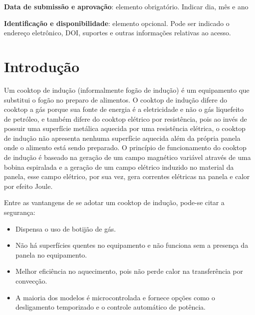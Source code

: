 \documentclass[
	article,			%
	11pt,				%
	oneside,			%
	a4paper,			%
	english,			%
	brazil,				%
	sumario=tradicional
	]{abntex2}
\begin{document}

\begin{center}\smaller
\textbf{Data de submissão e aprovação}: elemento obrigatório. Indicar dia, mês e ano

\textbf{Identificação e disponibilidade}: elemento opcional. Pode ser indicado 
o endereço eletrônico, DOI, suportes e outras informações relativas ao acesso.
\end{center}

\textual

\section{Introdução}

Um cooktop de indução (informalmente fogão de indução) é um equipamento que substitui o fogão no preparo de alimentos. O cooktop de indução difere do cooktop a gás porque sua fonte de energia é a eletricidade e não o gás liquefeito de petróleo, e também difere do cooktop elétrico por resistência, pois ao invés de possuir uma superfície metálica aquecida por uma resistência elétrica, o cooktop de indução não apresenta nenhuma superfície aquecida além da própria panela onde o alimento está sendo preparado. O princípio de funcionamento do cooktop de indução é baseado na geração de um campo magnético variável através de uma bobina espiralada e a geração de um campo elétrico induzido no material da panela, esse campo elétrico, por sua vez, gera correntes elétricas na panela e calor por efeito Joule.

Entre as vantangens de se adotar um cooktop de indução, pode-se citar a segurança:

\begin{itemize}
	\item Dispensa o uso de botijão de gás.
	\item Não há superfícies quentes no equipamento e não funciona sem a presença da panela no equipamento.
	\item Melhor eficiência no aquecimento, pois não perde calor na transferência por convecção.
	\item A maioria dos modelos é microcontrolada e fornece opções como o desligamento temporizado e o controle automático de potência.
\end{itemize}
\end{document}

